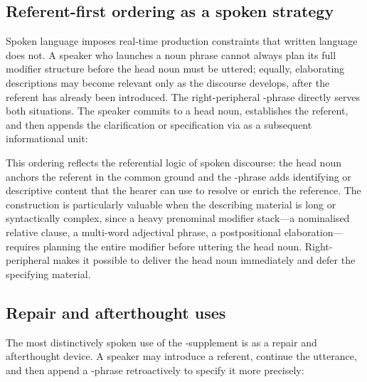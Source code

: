 \subsection{Referent-first ordering as a spoken strategy}
\label{sec:spoken-ty-strategy}

Spoken language imposes real-time production constraints that written language
does not. A speaker who launches a noun phrase cannot always plan its full
modifier structure before the head noun must be uttered; equally, elaborating
descriptions may become relevant only as the discourse develops, after the
referent has already been introduced. The right-peripheral -phrase
directly serves both situations. The speaker commits to a head noun,
establishes the referent, and then appends the clarification or specification
via  as a subsequent informational unit:

\pex
\a {}
\a {}
\a {}
\xe

\noindent This ordering reflects the referential logic of spoken discourse: the
head noun anchors the referent in the common ground and the -phrase
adds identifying or descriptive content that the hearer can use to resolve or
enrich the reference. The construction is particularly valuable when the
describing material is long or syntactically complex, since a heavy prenominal
modifier stack---a nominalised relative clause, a multi-word adjectival phrase,
a postpositional elaboration---requires planning the entire modifier before
uttering the head noun. Right-peripheral  makes it possible to deliver
the head noun immediately and defer the specifying material.

\subsection{Repair and afterthought uses}
\label{sec:spoken-ty-repair}

The most distinctively spoken use of the -supplement is as a repair
and afterthought device. A speaker may introduce a referent, continue the
utterance, and then append a -phrase retroactively to specify it more
precisely:

\pex
{}
\xe



